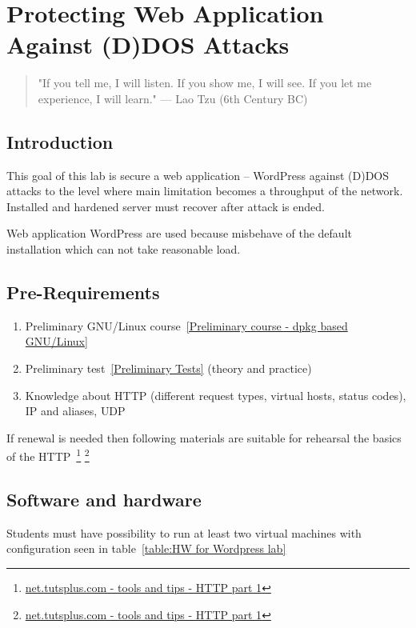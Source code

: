 

\chapter{Protecting Web Application Against (D)DOS Attacks}
\label{Protecting Web Application Against (D)DOS Attacks}

 
\begin{quote}
"If you tell me, I will listen. If you show me, I
will see. If you let me experience, I will learn." --- Lao Tzu (6th Century BC)
\end{quote}

\section{Introduction}
This goal of this lab is secure a web application -- WordPress against (D)DOS attacks to the level where main limitation becomes a throughput of the network. Installed and hardened server must recover after attack is ended.

Web application WordPress are used because misbehave of the default installation which can not take reasonable load.

\section{Pre-Requirements}
\begin{enumerate}
\item Preliminary GNU/Linux course~\ref{Preliminary course - dpkg based GNU/Linux} 
\item Preliminary test~\ref{Preliminary Tests} (theory and practice)
\item Knowledge about \gls{HTTP} (different request types, virtual hosts, status codes), \gls{IP} and aliases, \gls{UDP}

\end{enumerate}

If renewal is needed then following materials are suitable for rehearsal the basics of the \gls{HTTP}~\footnote{
\href{http://net.tutsplus.com/tutorials/tools-and-tips/http-the-protocol-every-web-developer-must-know-part-1/}{net.tutsplus.com - tools and tips - HTTP part 1}} \footnote{
\href{http://net.tutsplus.com/tutorials/tools-and-tips/http-the-protocol-every-web-developer-must-know-part-2/}{net.tutsplus.com - tools and tips - HTTP part 1}}

\section{Software and hardware}
Students must have possibility to run at least two virtual machines with configuration seen in table~\ref{table:HW for Wordpress lab}

